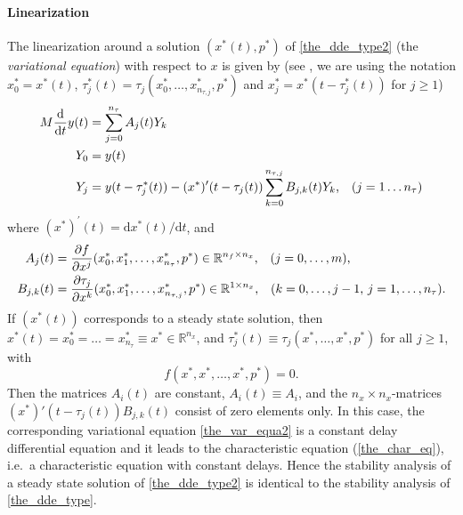 \documentclass[10pt]{scrartcl}
\newcommand{\define}[1]{\emph{#1}}
\renewcommand{\d}{\mathrm{d}}
\newcommand{\RR}{\mathbb{R}}
\begin{document}
\paragraph{Linearization}
The linearization around a solution $(x^*(t),p^*)$ of
\eqref{the_dde_type2} (the \define{variational equation}) with respect
to $x$ is given by (see \cite{HKWW06}, we are using the notation
$x^*_0=x^*(t)$, $\tau_j^*(t)=\tau_j(x^*_0,\ldots,x^*_{n_{\tau,j}},p^*)$ and
$x^*_j=x^*(t-\tau^*_j(t))$ for $j\geq1$)
\begin{equation}\label{the_var_equa2}
\begin{aligned}
M\frac{\d}{\d t}{y(t)}&=\sum_{j=0}^{n_\tau}A_j(t)Y_k \\
Y_0&=y(t)\\
Y_j&=y(t-\tau^*_j(t))-(x^*)'(t-\tau_j(t))\sum_{k=0}^{n_{\tau,j}}B_{j,k}(t)Y_k\mbox{,\quad($j=1\ldots n_\tau$)}
\end{aligned}
\end{equation}
where $(x^*)^{'}(t)={\d}x^*(t)/{\d}t$, and
\begin{equation}\label{A_def2}
\begin{aligned}
  A_j(t)&=\frac{\partial f}{\partial x^j}(x^*_0,x^*_1,\ldots,x^*_{n_\tau},p^*)\in\RR^{n_f\times n_x}
  \mbox{,\quad ($j=0,\ldots,m$),}\\
  B_{j,k}(t)&=\frac{\partial \tau_j}{\partial x^k}(x^*_0,x^*_1,\ldots,x^*_{n_{\tau,j}},p^*)\in\RR^{1\times n_x}\mbox{,\quad ($k=0,\ldots,j-1$, $j=1,\ldots,n_\tau$).} 
\end{aligned}
\end{equation}
If $(x^*(t))$ corresponds to a steady state solution, then
$x^*(t)=x^*_0=\ldots=x^*_{n_\tau}\equiv x^*\in\RR^{n_x}$, and
$\tau^*_j(t)\equiv \tau_j(x^*,\ldots,x^*,p^*)$ for all $j\geq1$,
with
\[
f(x^*,x^*,\ldots,x^*,p^*)=0\mbox{.}
\]
Then the matrices $A_i(t)$ are constant, $A_i(t)\equiv A_i$, and the
$n_x\times n_x$-matrices $(x^*)'(t-\tau_j(t))B_{j,k}(t)$ consist of zero elements only.  In this case, the
corresponding variational equation \eqref{the_var_equa2} is a constant
delay differential equation and it leads to the characteristic
equation (\ref{the_char_eq}), i.e.~a characteristic equation with
constant delays. Hence the stability analysis of a steady state
solution of \eqref{the_dde_type2} is identical to the stability analysis
of \eqref{the_dde_type}.
\end{document}
